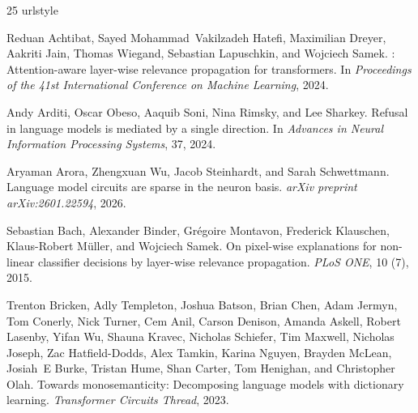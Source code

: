 \documentclass[11pt]{article}
\begin{document}
\begin{thebibliography}{25}
\providecommand{\natexlab}[1]{#1}
\providecommand{\url}[1]{\texttt{#1}}
\expandafter\ifx\csname urlstyle\endcsname\relax
  \providecommand{\doi}[1]{doi: #1}\else
  \providecommand{\doi}{doi: \begingroup \urlstyle{rm}\Url}\fi

Reduan Achtibat, Sayed Mohammad~Vakilzadeh Hatefi, Maximilian Dreyer, Aakriti
  Jain, Thomas Wiegand, Sebastian Lapuschkin, and Wojciech Samek.
: Attention-aware layer-wise relevance propagation for
  transformers.
\newblock In \emph{Proceedings of the 41st International Conference on Machine
  Learning}, 2024.

Andy Arditi, Oscar Obeso, Aaquib Soni, Nina Rimsky, and Lee Sharkey.
\newblock Refusal in language models is mediated by a single direction.
\newblock In \emph{Advances in Neural Information Processing Systems}, 37, 2024.

Aryaman Arora, Zhengxuan Wu, Jacob Steinhardt, and Sarah Schwettmann.
\newblock Language model circuits are sparse in the neuron basis.
\newblock \emph{arXiv preprint arXiv:2601.22594}, 2026.

Sebastian Bach, Alexander Binder, Gr{\'e}goire Montavon, Frederick Klauschen,
  Klaus-Robert M{\"u}ller, and Wojciech Samek.
\newblock On pixel-wise explanations for non-linear classifier decisions by
  layer-wise relevance propagation.
\newblock \emph{PLoS ONE}, 10 (7), 2015.

Trenton Bricken, Adly Templeton, Joshua Batson, Brian Chen, Adam Jermyn, Tom
  Conerly, Nick Turner, Cem Anil, Carson Denison, Amanda Askell, Robert
  Lasenby, Yifan Wu, Shauna Kravec, Nicholas Schiefer, Tim Maxwell, Nicholas
  Joseph, Zac Hatfield-Dodds, Alex Tamkin, Karina Nguyen, Brayden McLean,
  Josiah~E Burke, Tristan Hume, Shan Carter, Tom Henighan, and Christopher
  Olah.
\newblock Towards monosemanticity: Decomposing language models with dictionary
  learning.
\newblock \emph{Transformer Circuits Thread}, 2023.


\end{thebibliography}
\end{document}
